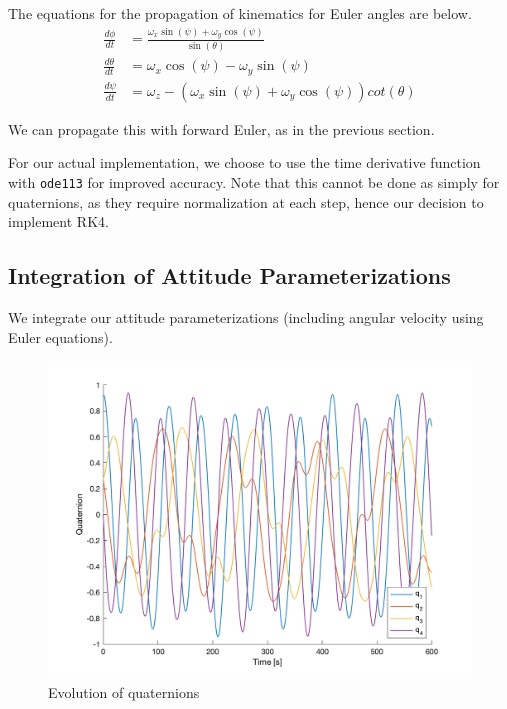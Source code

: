 The equations for the propagation of kinematics for Euler angles are below.
\begin{align*}
\frac{d \phi}{dt} &= \frac{\omega_{x} \sin(\psi) + \omega_{y} \cos(\psi)}{\sin(\theta)}\\
\frac{d \theta}{dt} &= \omega_{x} \cos(\psi) - \omega_{y} \sin(\psi)\\
\frac{d \psi}{dt} &= \omega_{z} - (\omega_{x} \sin(\psi) + \omega_{y} \cos(\psi)) cot(\theta)
\end{align*}



We can propagate this with forward Euler, as in the previous section.



For our actual implementation, we choose to use the time derivative function with \texttt{ode113} for improved accuracy. Note that this cannot be done as simply for quaternions, as they require normalization at each step, hence our decision to implement RK4.

\subsection{Integration of Attitude Parameterizations}
We integrate our attitude parameterizations (including angular velocity using Euler equations).

\begin{figure}[H]
\centering
\includegraphics[scale=0.6]{Images/ps3_problem6_quaternions.png}
\caption{Evolution of quaternions}
\label{fig:ps3_problem6_quaternions}
\end{figure}

